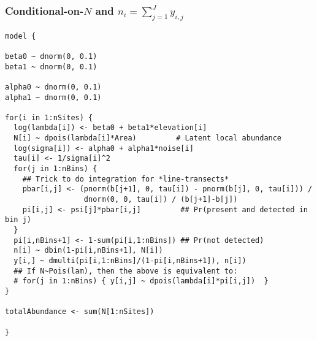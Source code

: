 \documentclass[color=usenames,dvipsnames]{beamer}\usepackage[]{graphicx}\usepackage[]{xcolor}
\makeatletter
\newenvironment{kframe}{%
 \def\at@end@of@kframe{}%
 \ifinner\ifhmode%
  \def\at@end@of@kframe{\end{minipage}}%
  \begin{minipage}{\columnwidth}%
 \fi\fi%
 \def\FrameCommand##1{\hskip\@totalleftmargin \hskip-\fboxsep
 \colorbox{shadecolor}{##1}\hskip-\fboxsep
     \hskip-\linewidth \hskip-\@totalleftmargin \hskip\columnwidth}%
 \MakeFramed {\advance\hsize-\width
   \@totalleftmargin\z@ \linewidth\hsize
   \@setminipage}}%
 {\par\unskip\endMakeFramed%
 \at@end@of@kframe}
\newenvironment{knitrout}{}{} %
\makeatother
\begin{document}
\begin{frame}[fragile]
  \frametitle{\normalsize Conditional-on-$N$ and $n_i=\sum_{j=1}^{J} y_{i,j}$}
\vspace{-3pt}
\begin{knitrout}\tiny
{}\color{fgcolor}\begin{kframe}
\begin{verbatim}
model {

beta0 ~ dnorm(0, 0.1)
beta1 ~ dnorm(0, 0.1)

alpha0 ~ dnorm(0, 0.1)
alpha1 ~ dnorm(0, 0.1)

for(i in 1:nSites) {
  log(lambda[i]) <- beta0 + beta1*elevation[i]
  N[i] ~ dpois(lambda[i]*Area)         # Latent local abundance
  log(sigma[i]) <- alpha0 + alpha1*noise[i]
  tau[i] <- 1/sigma[i]^2
  for(j in 1:nBins) {
    ## Trick to do integration for *line-transects*
    pbar[i,j] <- (pnorm(b[j+1], 0, tau[i]) - pnorm(b[j], 0, tau[i])) /
                  dnorm(0, 0, tau[i]) / (b[j+1]-b[j])
    pi[i,j] <- psi[j]*pbar[i,j]         ## Pr(present and detected in bin j)
  }
  pi[i,nBins+1] <- 1-sum(pi[i,1:nBins]) ## Pr(not detected)
  n[i] ~ dbin(1-pi[i,nBins+1], N[i])
  y[i,] ~ dmulti(pi[i,1:nBins]/(1-pi[i,nBins+1]), n[i])
  ## If N~Pois(lam), then the above is equivalent to:
  # for(j in 1:nBins) { y[i,j] ~ dpois(lambda[i]*pi[i,j])  }
}

totalAbundance <- sum(N[1:nSites])

}
\end{verbatim}
\end{kframe}
\end{knitrout}
\end{frame}
\end{document}
